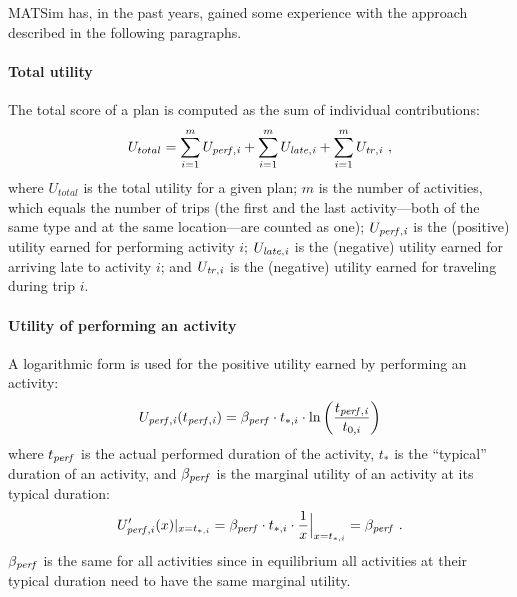 MATSim has, in the past years, gained some experience with the
approach described in the following paragraphs.


\paragraph{Total utility}

The total score of a plan is computed as the sum of individual
contributions:
\begin{equation}
\label{eq:UtilityFunction}
U_{total}= \sum_{i=1}^{m} U_{\it perf,i} + \sum_{i=1}^{m} U_{\it late,i} + \sum_{i=1}^{m} U_{\it tr,i}\ ,
\end{equation}
where $U_{total}$ is the total utility for a given plan; $m$ is the
number of activities, which equals the number of trips (the first and
the last activity---both of the same type and at the same
location---are counted as one); $U_{\it perf,i}$ is the (positive)
utility earned for performing activity $i$; $U_{\it late,i}$ is the
(negative) utility earned for arriving late to activity $i$; and
$U_{\it tr,i}$ is the (negative) utility earned for traveling during
trip $i$.

\paragraph{Utility of performing an activity}

A logarithmic form is used for the positive utility earned by
performing an activity:
\begin{equation}
\label{eq:U_perf}
U_{\it perf,i}(t_{\it perf,i}) = \beta_{\it perf}\cdot t_{*,i} \cdot
\ln\left(\frac{t_{\it perf,i}}{t_{0,i}}\right)
\end{equation}
where $t_{\it perf}$ is the actual performed duration of the activity, 
$t_{*}$ is the ``typical'' duration of an activity, and
$\beta_{\it perf}$ is the marginal utility of an activity at its typical
duration:
\begin{equation}
U'_{\perf,i}(x)|_{x=t_{*,i}} 
%
= \beta_{\perf} \cdot t_{*,i} \cdot \frac{1}{x} \Big|_{x=t_{*,i}}
%
= \beta_{\perf} \ .
\end{equation}
$\beta_{\it perf}$ is the same for all activities since in
equilibrium all activities at their typical duration need to have the
same marginal utility.

